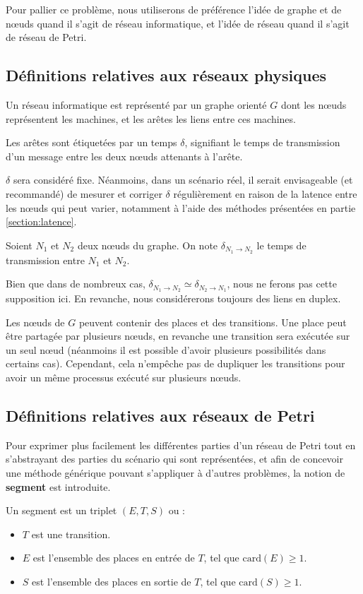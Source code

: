 Pour pallier ce problème, nous utiliserons de préférence l'idée de graphe et de nœuds quand il s'agit de réseau informatique, et l'idée de réseau quand il s'agit de réseau de Petri.

\subsection{Définitions relatives aux réseaux physiques}
\begin{mydef}
Un réseau informatique est représenté par un graphe orienté $G$ dont les nœuds représentent les machines, et les arêtes les liens entre ces machines. 

Les arêtes sont étiquetées par un temps $\delta$, signifiant le temps de transmission d'un message entre les deux nœuds attenants à l'arête.
\end{mydef}
$\delta$ sera considéré fixe. Néanmoins, dans un scénario réel, il serait envisageable (et recommandé) de mesurer et corriger $\delta$ régulièrement en raison de la latence entre les nœuds qui peut varier, notamment à l'aide des méthodes présentées en partie \ref{section:latence}.
\\
\begin{mynot}
	Soient $N_1$ et $N_2$ deux nœuds du graphe. On note $\delta_{N_1 \rightarrow N_2}$ le temps de transmission entre $N_1$ et $N_2$.
\end{mynot} 

Bien que dans de nombreux cas, $\delta_{N_1 \rightarrow N_2} \simeq \delta_{N_2 \rightarrow N_1}$, nous ne ferons pas cette supposition ici. En revanche, nous considérerons toujours des liens en duplex.

Les nœuds de $G$ peuvent contenir des places et des transitions. Une place peut être partagée par plusieurs nœuds, en revanche une transition sera exécutée sur un seul nœud (néanmoins il est possible d'avoir plusieurs possibilités dans certains cas). Cependant, cela n'empêche pas de dupliquer les transitions pour avoir un même processus exécuté sur plusieurs nœuds.

\subsection{Définitions relatives aux réseaux de Petri}
Pour exprimer plus facilement les différentes parties d'un réseau de Petri tout en s'abstrayant des parties du scénario qui sont représentées, et afin de concevoir une méthode générique pouvant s'appliquer à d'autres problèmes, la notion de \textbf{segment} est introduite.
\begin{mydef}[Segment]
Un segment est un triplet $(E, T , S)$ ou : 
\begin{itemize}
	\item $T$ est une transition.
	\item $E$ est l'ensemble des places en entrée de $T$, tel que $\mathrm{card}(E) \geq \num{1}$.
	\item $S$ est l'ensemble des places en sortie de $T$, tel que $\mathrm{card}(S) \geq \num{1}$.
\end{itemize} 
\end{mydef}

